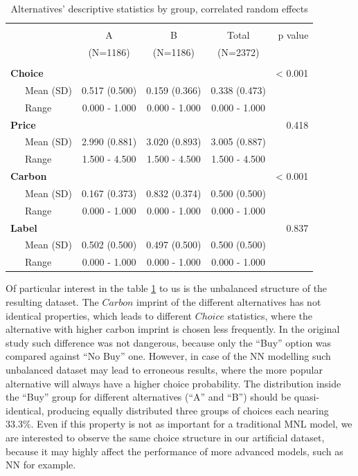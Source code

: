 \documentclass[12pt,]{article}
\begin{document}
\begin{table}[!htbp] \centering 
  \caption{Alternatives' descriptive statistics by group, correlated random effects} 
  \label{tab:altdata} 
\begin{tabular}{@{\extracolsep{5pt}}lcccr}
\\[-1.8ex]\hline 
\hline \\[-1.8ex] 
 & A  & B  & Total  & p value\\
 & (N=1186) & (N=1186) & (N=2372) &  \\
\hline \\[-1.8ex] 
\textbf{Choice} &  &  &  & < 0.001\\
~~~Mean (SD) & 0.517 (0.500) & 0.159 (0.366) & 0.338 (0.473) & \\
~~~Range & 0.000 - 1.000 & 0.000 - 1.000 & 0.000 - 1.000 & \\
\textbf{Price} &  &  &  & 0.418\\
~~~Mean (SD) & 2.990 (0.881) & 3.020 (0.893) & 3.005 (0.887) & \\
~~~Range & 1.500 - 4.500 & 1.500 - 4.500 & 1.500 - 4.500 & \\
\textbf{Carbon} &  &  &  & < 0.001\\
~~~Mean (SD) & 0.167 (0.373) & 0.832 (0.374) & 0.500 (0.500) & \\
~~~Range & 0.000 - 1.000 & 0.000 - 1.000 & 0.000 - 1.000 & \\
\textbf{Label} &  &  &  & 0.837\\
~~~Mean (SD) & 0.502 (0.500) & 0.497 (0.500) & 0.500 (0.500) & \\
~~~Range & 0.000 - 1.000 & 0.000 - 1.000 & 0.000 - 1.000 & \\
\hline
\end{tabular}
\end{table}

Of particular interest in the table \ref{tab:altdata} to us is the
unbalanced structure of the resulting dataset. The \(Carbon\) imprint of
the different alternatives has not identical properties, which leads to
different \(Choice\) statistics, where the alternative with higher
carbon imprint is chosen less frequently. In the original study such
difference was not dangerous, because only the ``Buy'' option was
compared against ``No Buy'' one. However, in case of the NN modelling
such unbalanced dataset may lead to erroneous results, where the more
popular alternative will always have a higher choice probability. The
distribution inside the ``Buy'' group for different alternatives (``A''
and ``B'') should be quasi-identical, producing equally distributed
three groups of choices each nearing 33.3\%. Even if this property is
not as important for a traditional MNL model, we are interested to
observe the same choice structure in our artificial dataset, because it
may highly affect the performance of more advanced models, such as NN
for example.
\end{document}
